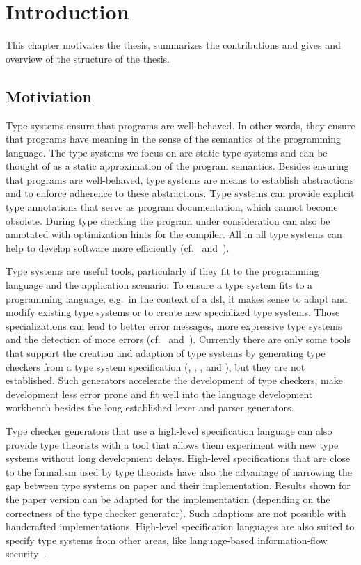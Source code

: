 \chapter{Introduction}
This chapter motivates the thesis, summarizes the contributions and
gives and overview of the structure of the thesis.

\section{Motiviation}
Type systems ensure that programs are well-behaved. In other words,
they ensure that programs have meaning in the sense of the semantics
of the programming language. The type systems we focus on are static
type systems and can be thought of as a static approximation of the
program semantics. Besides ensuring that programs are well-behaved,
type systems are means to establish abstractions and to enforce
adherence to these abstractions. Type systems can provide explicit
type annotations that serve as program documentation, which cannot
become obsolete. During type checking the program under consideration
can also be annotated with optimization hints for the compiler. All in
all type systems can help to develop software more efficiently
(cf.~\cite{Petersen:2014:ECS:2597008.2597152}
and~\cite{Mayer:2012:ESI:2384616.2384666}).

Type systems are useful tools, particularly if they fit to the
programming language and the application scenario. To ensure a type
system fits to a programming language, e.g.\ in the context of a
\gls{dsl}, it makes sense to adapt and modify existing type systems or
to create new specialized type systems. Those specializations can lead
to better error messages, more expressive type systems and the
detection of more errors (cf.~\cite{Thiemann02programmabletype}
and~\cite{vandenBrand:2010:FST:1868281.1868293}). Currently there are
only some tools that support the creation and adaption of type systems
by generating type checkers from a type system specification
(\cite{Markstrum:2010:JDP:1667048.1667049}, \cite{ortin2014automatic},
\cite{gast2005generator}, \cite{tomb2005automatic} and
\cite{bergan2007typmix}), but they are not established. Such
generators accelerate the development of type checkers, make
development less error prone and fit well into the language
development workbench besides the long established lexer and parser
generators.

Type checker generators that use a high-level specification language
can also provide type theorists with a tool that allows them
experiment with new type systems without long development
delays. High-level specifications that are close to the formalism used
by type theorists have also the advantage of narrowing the gap between
type systems on paper and their implementation. Results shown for the
paper version can be adapted for the implementation (depending on the
correctness of the type checker generator). Such adaptions are not
possible with handcrafted implementations. High-level specification
languages are also suited to specify type systems from other areas,
like language-based information-flow
security~\cite{Sabelfeld:2006:LIS:2312191.2314769}.

